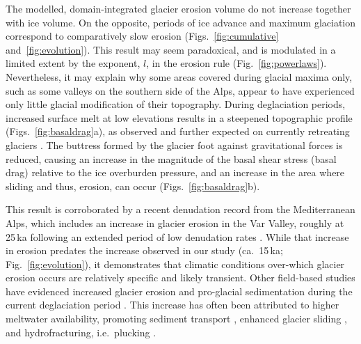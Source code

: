 \documentclass[esurf, manuscript]{copernicus}
\begin{document}
    The modelled, domain-integrated glacier erosion volume do not increase
    together with ice volume. On the opposite, periods of ice advance and
    maximum glaciation correspond to comparatively slow erosion
    (Figs.~\ref{fig:cumulative} and~\ref{fig:evolution}).
    This result may seem paradoxical, and is modulated in a limited extent by
    the exponent, $l$, in the erosion rule (Fig.~\ref{fig:powerlaws}).
    Nevertheless, it may explain why some areas covered during glacial maxima
    only, such as some valleys on the southern side of the Alps, appear to have
    experienced only little glacial modification of their topography.
    During deglaciation periods, increased surface melt at low elevations
    results in a steepened topographic profile (Figs.~\ref{fig:basaldrag}a),
    as observed and further expected on currently retreating glaciers
    \citep{Huss.etal.2010, Zekollari.Huybrechts.2015}.
    The buttress formed by the glacier foot against gravitational forces is
    reduced, causing an increase in the magnitude of the basal shear stress
    (basal drag) relative to the ice overburden pressure, and an increase in
    the area where sliding and thus, erosion, can occur
    (Figs.~\ref{fig:basaldrag}b).

    This result is corroborated by a recent denudation record from the
    Mediterranean Alps, which includes an increase in glacier erosion in the
    Var Valley, roughly at 25\,ka following an extended period of low
    denudation rates \citep{Mariotti.etal.2021}. While that increase in
    erosion predates the increase observed in our study (ca.~15\,ka;
    Fig.~\ref{fig:evolution}), it demonstrates that climatic conditions
    over-which glacier erosion occurs are relatively specific and likely
    transient. Other field-based studies have evidenced increased glacier
    erosion and pro-glacial sedimentation during the current deglaciation period
    \citep[e.g.,][]{Koppes.Montgomery.2009, Micheletti.Lane.2016,
    Lane.etal.2017, Bendixen.etal.2017}. This increase has often been
    attributed to higher meltwater availability, promoting sediment transport
    \citep{Delaney.Adhikari.2020}, enhanced glacier sliding
    \citep{Herman.etal.2011}, and hydrofracturing, i.e.~plucking
    \citep{Hallet.1996, Ugelvig.etal.2018, Hildes.etal.2004}.
\end{document}
